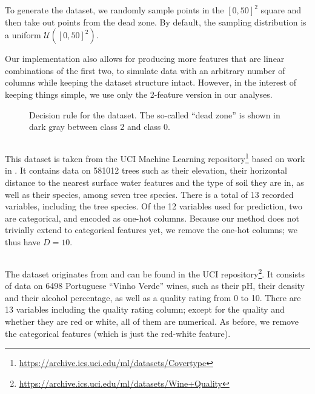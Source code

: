 \documentclass[../main.tex]{subfiles}
\begin{document}
To generate the dataset, we randomly sample points in the $[0, 50]^2$ square and then take out points from the dead zone. By default, the sampling distribution is a uniform $\mathcal{U}([0, 50]^2)$.

Our implementation also allows for producing more features that are linear combinations of the first two, to simulate data with an arbitrary number of columns while keeping the dataset structure intact.
However, in the interest of keeping things simple, we use only the 2-feature version in our analyses.

\begin{figure}[h]
    \centering

\caption{Decision rule for the \CakeOnSea dataset. The so-called ``dead zone'' is shown in dark gray between class 2 and class 0.}
    \label{fig:cake_on_sea}
\end{figure}

\subsection{\ForestCover}

This dataset is taken from the UCI Machine Learning repository\footnote{\url{https://archive.ics.uci.edu/ml/datasets/Covertype}} \cite{duaUCI2019} based on work in \cite{blackardComparative1999}.
It contains data on 581012 trees such as their elevation, their horizontal distance to the nearest surface water features and the type of soil they are in, as well as their species, among seven tree species. There is a total of 13 recorded variables, including the tree species. Of the 12 variables used for prediction, two are categorical, and encoded as one-hot columns.
Because our method does not trivially extend to categorical features yet, we remove the one-hot columns; we thus have $D = 10$.

\subsection{\WineQuality}

The \WineQuality{} dataset originates from \cite{cortezModeling2009} and can be found in the UCI repository\footnote{\url{https://archive.ics.uci.edu/ml/datasets/Wine+Quality}}.
It consists of data on 6498 Portuguese ``Vinho Verde'' wines, such as their pH, their density and their alcohol percentage, as well as a quality rating from 0 to 10.
There are 13 variables including the quality rating column; except for the quality and whether they are red or white, all of them are numerical.
As before, we remove the categorical features (which is just the red-white feature).
\end{document}
